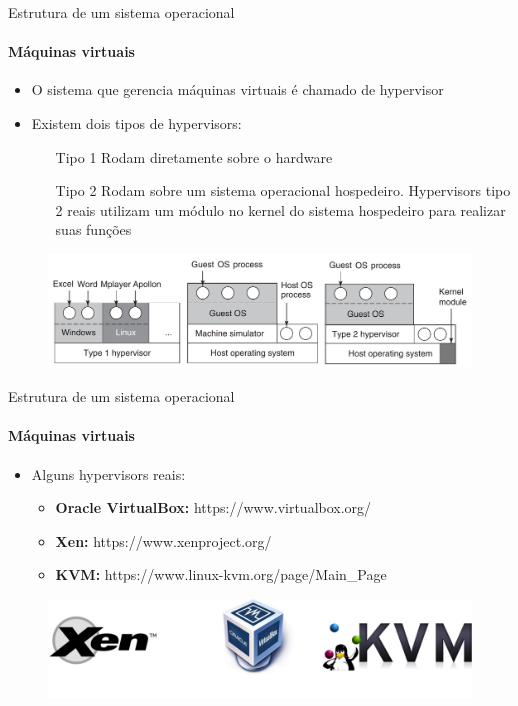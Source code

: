 \documentclass{beamer}
\begin{document}
\begin{frame}{Estrutura de um sistema operacional}
	\framesubtitle{Máquinas virtuais}
	\begin{itemize}
		\item O sistema que gerencia máquinas virtuais é chamado de \alert{hypervisor}
		\item Existem dois tipos de hypervisors:
		\begin{itemize}
			\item[Tipo 1] Rodam diretamente sobre o hardware
			\item[Tipo 2] Rodam sobre um sistema operacional hospedeiro. Hypervisors tipo 2 reais utilizam um módulo no kernel do sistema hospedeiro para realizar suas funções
		\end{itemize}
	\end{itemize}
	\begin{figure}
		\includegraphics[width=0.8\paperwidth]{resources/hypervisor}
	\end{figure}
\end{frame}
\begin{frame}{Estrutura de um sistema operacional}
	\framesubtitle{Máquinas virtuais}
	\begin{itemize}
		\item Alguns hypervisors reais:
		\begin{itemize}
			\item \textbf{Oracle VirtualBox:} https://www.virtualbox.org/
			\item \textbf{Xen:} https://www.xenproject.org/
			\item \textbf{KVM:} https://www.linux-kvm.org/page/Main\_Page
		\end{itemize}
	\end{itemize}
	\begin{figure}
		\includegraphics[width=0.8\paperwidth]{resources/vms}
	\end{figure}
\end{frame}
\end{document}
